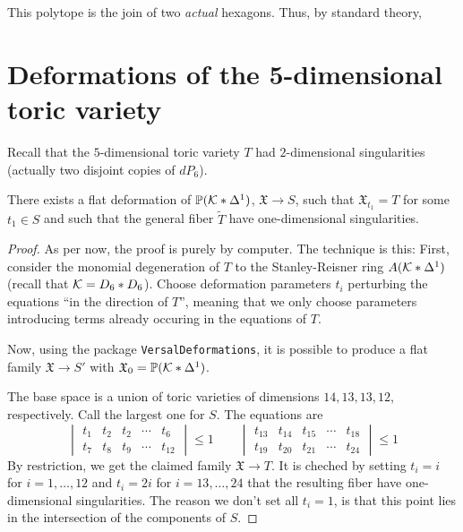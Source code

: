 \documentclass[11pt, english]{article}
\begin{document}
This polytope is the join of two \emph{actual} hexagons. Thus, by standard theory, 

\section{Deformations of the 5-dimensional toric variety}

Recall that the $5$-dimensional toric variety $T$ had $2$-dimensional singularities (actually two disjoint copies of $dP_6$).

\begin{thm}
There exists a flat deformation of $\mathbb{P}(\mathcal K \ast \Delta^1)$, $\mathfrak X \to S$, such that $\mathfrak X_{t_1} = T$ for some $t_1 \in S$ and such that the general fiber $\widetilde T$ have one-dimensional singularities.
\end{thm}
\begin{proof}
 As per now, the proof is purely by computer. The technique is this: First, consider the monomial degeneration of $T$ to the Stanley-Reisner ring $A(\mathcal K \ast \Delta^1)$ (recall that $\mathcal K=D_6 \ast D_6$). Choose deformation parameters $t_i$ perturbing the equations ``in the direction of $T$'', meaning that we only choose parameters introducing terms already occuring in the equations of $T$.

Now, using the package \verb|VersalDeformations|, it is possible to produce a flat family $\mathfrak X \to S'$ with $\mathfrak X_0 = \mathbb{P}(\mathcal K \ast \Delta^1)$.

The base space is a union of toric varieties of dimensions $14,13,13,12$, respectively. Call the largest one for $S$. The equations are 
\[
\begin{vmatrix}
 t_1 & t_2 & t_2 &  \cdots & t_{6} \\
 t_7 & t_8 &  t_9 & \cdots & t_{12} 
\end{vmatrix} \leq 1 \qquad 
\begin{vmatrix}
 t_{13} & t_{14} & t_{15} &  \cdots & t_{18} \\
 t_{19} & t_{20}  & t_{21} & \cdots & t_{24} 
\end{vmatrix} \leq 1 
\]
By restriction, we get the claimed family $\mathfrak X \to T$. It is cheched by setting $t_i=i$ for $i=1,\ldots,12$ and $t_i=2i$ for $i=13,\ldots,24$ that the resulting fiber have one-dimensional singularities. The reason we don't set all $t_i=1$, is that this point lies in the intersection of the components of $S$. 
\end{proof}
\end{document}
